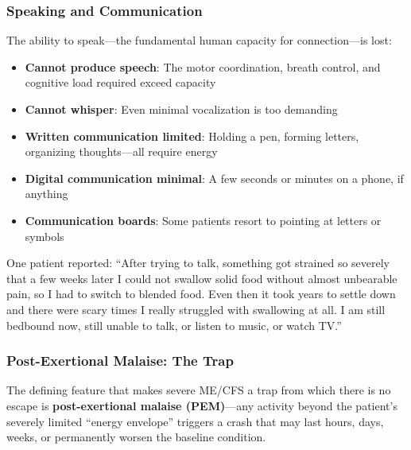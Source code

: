 \subsubsection{Speaking and Communication}

The ability to speak---the fundamental human capacity for connection---is lost:

\begin{itemize}
    \item \textbf{Cannot produce speech}: The motor coordination, breath control, and cognitive load required exceed capacity
    \item \textbf{Cannot whisper}: Even minimal vocalization is too demanding
    \item \textbf{Written communication limited}: Holding a pen, forming letters, organizing thoughts---all require energy
    \item \textbf{Digital communication minimal}: A few seconds or minutes on a phone, if anything
    \item \textbf{Communication boards}: Some patients resort to pointing at letters or symbols
\end{itemize}

One patient reported: ``After trying to talk, something got strained so severely that a few weeks later I could not swallow solid food without almost unbearable pain, so I had to switch to blended food. Even then it took years to settle down and there were scary times I really struggled with swallowing at all. I am still bedbound now, still unable to talk, or listen to music, or watch TV.''

\subsubsection{Post-Exertional Malaise: The Trap}
\label{subsec:pem-trap}

The defining feature that makes severe ME/CFS a trap from which there is no escape is \textbf{post-exertional malaise (PEM)}---any activity beyond the patient's severely limited ``energy envelope'' triggers a crash that may last hours, days, weeks, or permanently worsen the baseline condition.

